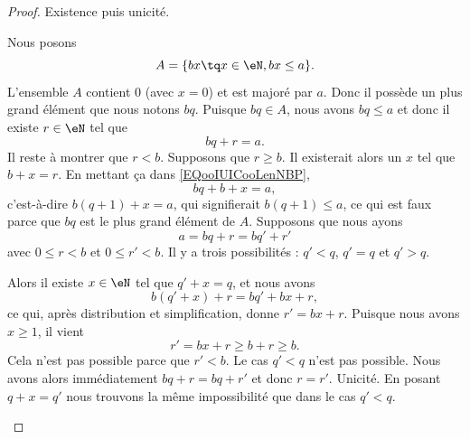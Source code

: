 \begin{proof}
	Existence puis unicité.
	\begin{subproof}
		\spitem[Existence]

		Nous posons
		\begin{equation}
			A=\{ bx\tq x\in \eN,bx\leq a \}.
		\end{equation}
		L'ensemble \( A\) contient \( 0\) (avec \( x=0\)) et est majoré par \( a\). Donc il possède un plus grand élément que nous notons \( bq\). Puisque \( bq\in A\), nous avons \( bq\leq a\) et donc il existe \( r\in \eN\) tel que
		\begin{equation}        \label{EQooIUICooLenNBP}
			bq+r=a.
		\end{equation}
		Il reste à montrer que \( r<b\). Supposons que \( r\geq b\). Il existerait alors un \( x\) tel que \( b+x=r\). En mettant ça dans \eqref{EQooIUICooLenNBP},
		\begin{equation}
			bq+b+x=a,
		\end{equation}
		c'est-à-dire \( b(q+1)+x=a\), qui signifierait \( b(q+1)\leq a\), ce qui est faux parce que \( bq\) est le plus grand élément de \( A\).
		\spitem[Unicité]
		Supposons que nous ayons
		\begin{equation}
			a=bq+r=bq'+r'
		\end{equation}
		avec \( 0\leq r<b\) et \( 0\leq r'<b\). Il y a trois possibilités : \( q'<q\), \( q'=q\) et \( q'>q\).
		\begin{subproof}
			\spitem[Si \( q'<q\)]
			Alors il existe \( x\in \eN\) tel que \( q'+x=q\), et nous avons
			\begin{equation}
				b(q'+x)+r=bq'+bx+r,
			\end{equation}
			ce qui, après distribution et simplification, donne \( r'=bx+r\). Puisque nous avons \( x\geq 1\), il vient
			\begin{equation}
				r'=bx+r\geq b+r\geq b.
			\end{equation}
			Cela n'est pas possible parce que \( r'<b\). Le cas \( q'<q\) n'est pas possible.
			\spitem[Si \( q'=q\)]
			Nous avons alors immédiatement \( bq+r=bq+r'\) et donc \( r=r'\). Unicité.
			\spitem[Si \( q'>q\)]
			En posant \( q+x=q'\) nous trouvons la même impossibilité que dans le cas \( q'<q\).
		\end{subproof}
	\end{subproof}
\end{proof}

